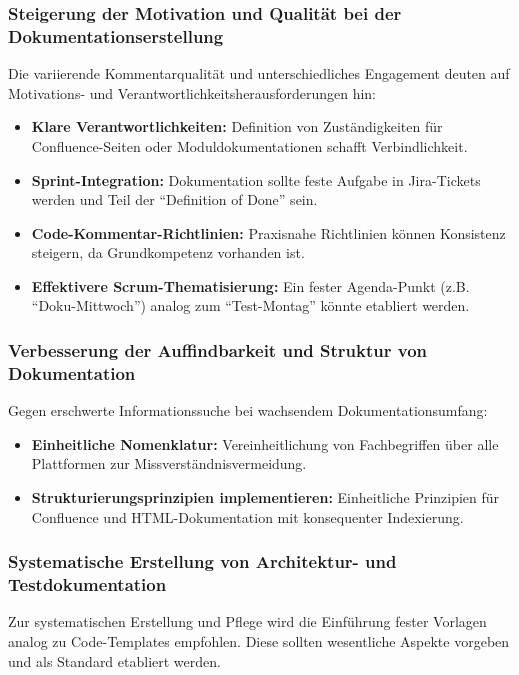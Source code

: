 \documentclass[12pt,oneside]{article}
\begin{document}
    \subsubsection{Steigerung der Motivation und Qualität bei der Dokumentationserstellung}
    \label{subsubsec:doku_motivation_qualitaet}
    Die variierende Kommentarqualität und unterschiedliches Engagement deuten auf Motivations- und Verantwortlichkeitsherausforderungen hin:
    \begin{itemize}
        \item \textbf{Klare Verantwortlichkeiten:} Definition von Zuständigkeiten für Confluence-Seiten oder Moduldokumentationen schafft Verbindlichkeit.
        \item \textbf{Sprint-Integration:} Dokumentation sollte feste Aufgabe in Jira-Tickets werden und Teil der ``Definition of Done'' sein.
        \item \textbf{Code-Kommentar-Richtlinien:} Praxisnahe Richtlinien können Konsistenz steigern, da Grundkompetenz vorhanden ist.
        \item \textbf{Effektivere Scrum-Thematisierung:} Ein fester Agenda-Punkt (z.B. ``Doku-Mittwoch'') analog zum ``Test-Montag'' könnte etabliert werden.
    \end{itemize}

    \subsubsection{Verbesserung der Auffindbarkeit und Struktur von Dokumentation}
    \label{subsubsec:doku_auffindbarkeit}
    Gegen erschwerte Informationssuche bei wachsendem Dokumentationsumfang:
    \begin{itemize}
        \item \textbf{Einheitliche Nomenklatur:} Vereinheitlichung von Fachbegriffen über alle Plattformen zur Missverständnisvermeidung.
        \item \textbf{Strukturierungsprinzipien implementieren:} Einheitliche Prinzipien für Confluence und HTML-Dokumentation mit konsequenter Indexierung.
    \end{itemize}

    \subsubsection{Systematische Erstellung von Architektur- und Testdokumentation}
    \label{subsubsec:doku_architektur_test}
    Zur systematischen Erstellung und Pflege wird die Einführung fester Vorlagen analog zu Code-Templates empfohlen. Diese sollten wesentliche Aspekte vorgeben und als Standard etabliert werden.
\end{document}
